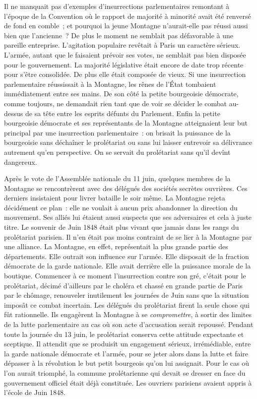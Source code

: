 \documentclass[twoside]{book} %
\begin{document}
Il ne manquait pas d’exemples d’insurrections parlementaires remontant à l’époque de la Convention où le rapport de majorité à minorité avait été renversé de fond en comble ; et pourquoi la jeune Montagne n’aurait-elle pas réussi aussi bien que l’ancienne ? De plus le moment ne semblait pas défavorable à une pareille entreprise. L’agitation populaire revêtait à Paris un caractère sérieux. L’armée, autant que le faisaient prévoir ses votes, ne semblait pas bien disposée pour le gouvernement. La majorité législative était encore de date trop récente pour s’être consolidée. De plus elle était composée de vieux. Si une insurrection parlementaire réussissait à la Montagne, les rênes de l’État tombaient immédiatement entre ses mains. De son côté la petite bourgeoisie démocrate, comme toujours, ne demandait rien tant que de voir se décider le combat au-dessus de sa tête entre les esprits défunts du Parlement. Enfin la petite bourgeoisie démocrate et ses représentants de la Montagne atteignaient leur but principal par une insurrection parlementaire : on brisait la puissance de la bourgeoisie sans déchaîner le prolétariat ou sans lui laisser entrevoir sa délivrance autrement qu’en perspective. On se servait du prolétariat sans qu’il devînt dangereux.\par
Après le vote de l’Assemblée nationale du 11 juin, quelques membres de la Montagne se rencontrèrent avec des délégués des sociétés secrètes ouvrières. Ces derniers insistaient pour livrer bataille le soir même. La Montagne rejeta décidément ce plan : elle ne voulait à aucun prix abandonner la direction du mouvement. Ses alliés lui étaient aussi suspects que ses adversaires et cela à juste titre. Le souvenir de Juin 1848 était plus vivant que jamais dans les rangs du prolétariat parisien. Il n’en était pas moins contraint de se lier à la Montagne par une alliance. La Montagne, en effet, représentait la plus grande partie des départements. Elle outrait son influence sur l’armée. Elle disposait de la fraction démocrate de la garde nationale. Elle avait derrière elle la puissance morale de la boutique. Commencer à ce moment l’insurrection contre son gré, c’était pour le prolétariat, décimé d’ailleurs par le choléra et chassé en grande partie de Paris par le chômage, renouveler inutilement les journées de Juin sans que la situation imposât ce combat incertain. Les délégués du prolétariat firent la seule chose qui fût rationnelle. Ils engagèrent la Montagne à se \emph{compromettre}, à sortir des limites de la lutte parlementaire au cas où son acte d’accusation serait repoussé. Pendant toute la journée du 13 juin, le prolétariat conserva cette attitude expectante et sceptique. Il attendit que se produisît un engagement sérieux, irrémédiable, entre la garde nationale démocrate et l’armée, pour se jeter alors dans la lutte et faire dépasser à la révolution le but petit bourgeois qu’on lui assignait. Pour le cas où l’on aurait triomphé, la commune prolétarienne qui devait se dresser en face du gouvernement officiel était déjà constituée. Les ouvriers parisiens avaient appris à l’école de Juin 1848.\par
\end{document}
